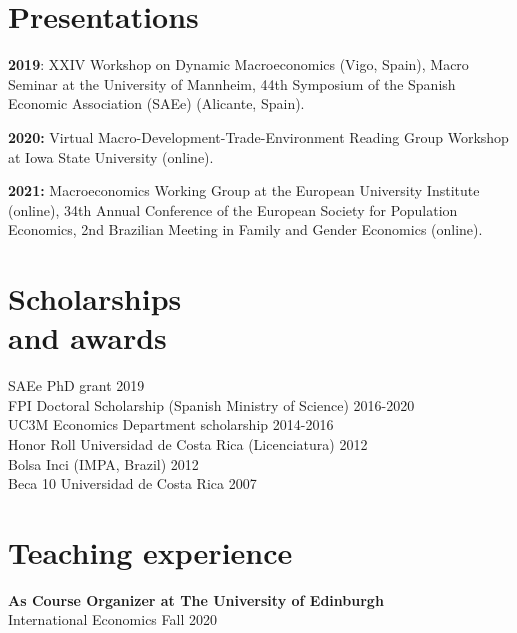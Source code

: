 \documentclass[margin]{res} %
\begin{document}
\begin{resume}
\section{Presentations}

{\bf 2019}: XXIV Workshop on Dynamic Macroeconomics (Vigo, Spain), Macro Seminar at the University of Mannheim, 44th Symposium of the Spanish Economic Association (SAEe) (Alicante, Spain).

{\bf 2020:} Virtual Macro-Development-Trade-Environment Reading Group Workshop at Iowa State University (online).

{\bf 2021:} Macroeconomics Working Group at the European University Institute (online), 34th Annual Conference of the European Society for Population Economics, 2nd Brazilian Meeting in Family and Gender Economics (online).



\section{Scholarships \\ and awards} 

SAEe PhD grant \hfill 2019\\
FPI Doctoral Scholarship (Spanish Ministry of Science) \hfill 2016-2020 \\
UC3M Economics Department scholarship \hfill 2014-2016 \\
Honor Roll Universidad de Costa Rica (Licenciatura) \hfill 2012 \\ 
Bolsa Inci (IMPA, Brazil) \hfill 2012 \\
Beca 10 Universidad de Costa Rica \hfill 2007


\section{Teaching experience}

{\bf As Course Organizer at The University of Edinburgh} \\
International Economics \hfill Fall 2020


\end{resume}
\end{document}
